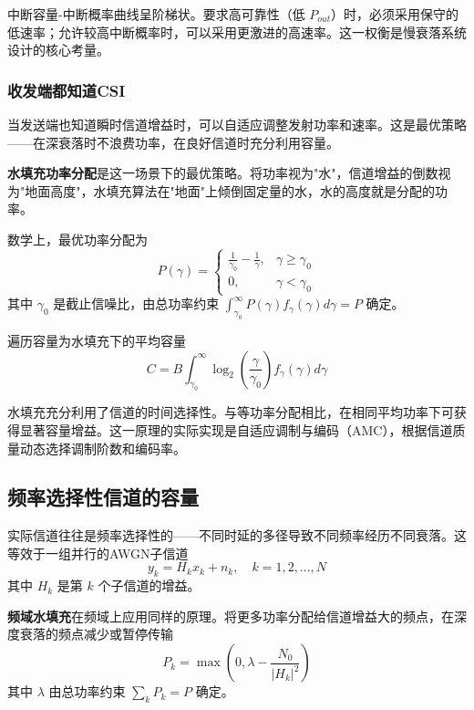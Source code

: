中断容量-中断概率曲线呈阶梯状。要求高可靠性（低 $P_{out}$）时，必须采用保守的低速率；允许较高中断概率时，可以采用更激进的高速率。这一权衡是慢衰落系统设计的核心考量。

\subsubsection{收发端都知道CSI}

当发送端也知道瞬时信道增益时，可以自适应调整发射功率和速率。这是最优策略——在深衰落时不浪费功率，在良好信道时充分利用容量。

\textbf{水填充功率分配}是这一场景下的最优策略。将功率视为"水"，信道增益的倒数视为"地面高度"，水填充算法在"地面"上倾倒固定量的水，水的高度就是分配的功率。

数学上，最优功率分配为
\begin{equation}
    P(\gamma) = \begin{cases}
        \frac{1}{\gamma_0} - \frac{1}{\gamma}, & \gamma \geq \gamma_0 \\
        0, & \gamma \lt \gamma_0
    \end{cases}
\end{equation}
其中 $\gamma_0$ 是截止信噪比，由总功率约束 $\int_{\gamma_0}^\infty P(\gamma) f_\gamma(\gamma) d\gamma = P$ 确定。

遍历容量为水填充下的平均容量
\begin{equation}
    C = B \int_{\gamma_0}^\infty \log_2\left(\frac{\gamma}{\gamma_0}\right) f_\gamma(\gamma) d\gamma
\end{equation}

水填充充分利用了信道的时间选择性。与等功率分配相比，在相同平均功率下可获得显著容量增益。这一原理的实际实现是自适应调制与编码（AMC），根据信道质量动态选择调制阶数和编码率。

\subsection{频率选择性信道的容量}

实际信道往往是频率选择性的——不同时延的多径导致不同频率经历不同衰落。这等效于一组并行的AWGN子信道
\begin{equation}
    y_k = H_k x_k + n_k, \quad k = 1, 2, ..., N
\end{equation}
其中 $H_k$ 是第 $k$ 个子信道的增益。

\textbf{频域水填充}在频域上应用同样的原理。将更多功率分配给信道增益大的频点，在深度衰落的频点减少或暂停传输
\begin{equation}
    P_k = \max\left(0, \lambda - \frac{N_0}{|H_k|^2}\right)
\end{equation}
其中 $\lambda$ 由总功率约束 $\sum_k P_k = P$ 确定。

